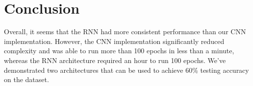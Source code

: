 \documentclass{article}
\begin{document}
\section{Conclusion}
\label{sec:conclusion}

Overall, it seems that the RNN had more consistent performance than our CNN implementation.
However, the CNN implementation significantly reduced complexity and was able to run more than 100 epochs in less than a minute, whereas the RNN architecture required an hour to run 100 epochs.
We’ve demonstrated two architectures that can be used to achieve 60\% testing accuracy on the dataset.



\end{document}
